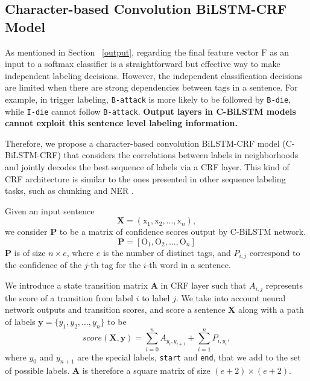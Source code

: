 \subsection{Character-based Convolution BiLSTM-CRF Model}
As mentioned in Section ~\ref{output}, regarding the final feature vector $\text{F}$ as an input to a softmax classifier is a straightforward but effective way to make independent labeling decisions. However, the independent classification decisions are limited when there are strong dependencies between tags in a sentence. For example, in trigger labeling, \texttt{B-attack} is more likely to be followed by \texttt{B-die}, while \texttt{I-die} cannot follow \texttt{B-attack}. \textbf{Output layers in C-BiLSTM models cannot exploit this sentence level labeling information.}

Therefore, we propose a character-based convolution BiLSTM-CRF model (C-BiLSTM-CRF) that considers the correlations between labels in neighborhoods and jointly decodes the best sequence of labels via a CRF layer. This kind of CRF architecture is similar to the ones presented in other sequence labeling tasks, such as chunking and NER \cite{collobert2011natural,huang2015bidirectional,lample2016neural}.

Given an input sentence
\begin{displaymath}
	\bm{X} = (\text{x}_1, \text{x}_2, \ldots, \text{x}_n),
\end{displaymath}
we consider $\bm{P}$ to be a matrix of confidence scores output by C-BiLSTM network.
\begin{equation}
	\bm{P} = [\text{O}_1, \text{O}_2, \ldots, \text{O}_n]
\end{equation}
$\bm{P}$ is of size $n \times e$, where $e$ is the number of distinct tags, and $P_{i,j}$ correspond to the confidence of the $j$-th tag for the $i$-th word in a sentence.

We introduce a state transition matrix $\bm{A}$ in CRF layer such that $A_{i,j}$ represents the score of a transition from label $i$ to label $j$. We take into account neural network outputs and transition scores, and score a sentence $\bm{X}$ along with a path of labels $\bm{y}=\{y_1, y_2, \ldots, y_n\}$ to be
\begin{equation}
	score(\bm{X}, \bm{y}) = \sum\limits_{i=0}^nA_{y_i, y_{i+1}} + \sum\limits_{i=1}^nP_{i, y_i},
\end{equation}
where $y_0$ and $y_{n+1}$ are the special labels, \texttt{start} and \texttt{end}, that we add to the set of possible labels. $\bm{A}$ is therefore a square matrix of size $(e+2) \times (e+2)$.

